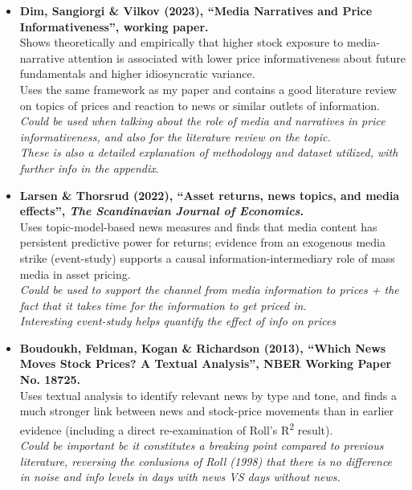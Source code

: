 \documentclass[11pt,a4paper]{article}
\begin{document}
\begin{itemize}
  \item \textbf{Dim, Sangiorgi \& Vilkov (2023), ``Media Narratives and Price Informativeness'', working paper.}\\
  Shows theoretically and empirically that higher stock exposure to media-narrative attention is associated with lower price informativeness about future fundamentals and higher idiosyncratic variance.\\
  Uses the same framework as my paper and contains a good literature review on topics of prices and reaction to news or similar outlets of information.\\
  \textit{Could be used when talking about the role of media and narratives in price informativeness, and also for the literature review on the topic.}\\ 
  \textit{These is also a detailed explanation of methodology and dataset utilized, with further info in the appendix}.

  \item \textbf{Larsen \& Thorsrud (2022), ``Asset returns, news topics, and media effects'', \emph{The Scandinavian Journal of Economics}.}\\
  Uses topic-model-based news measures and finds that media content has persistent predictive power for returns; evidence from an exogenous media strike (event-study) supports a causal information-intermediary role of mass media in asset pricing.\\
  \textit{Could be used to support the channel from media information to prices + the fact that it takes time for the information to get priced in.\\ 
  Interesting event-study helps quantify the effect of info on prices}

  \item \textbf{Boudoukh, Feldman, Kogan \& Richardson (2013), ``Which News Moves Stock Prices? A Textual Analysis'', NBER Working Paper No. 18725.}\\
  Uses textual analysis to identify relevant news by type and tone, and finds a much stronger link between news and stock-price movements than in earlier evidence (including a direct re-examination of Roll's R\textsuperscript{2} result).\\
  \textit{Could be important bc it constitutes a breaking point compared to previous literature, reversing the conlusions of Roll (1998) that there is no difference in noise and info levels in days with news VS days without news.}\\


\end{itemize}
\end{document}
